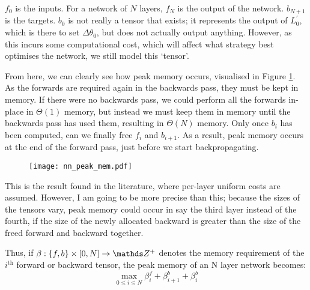 \(f_0\) is the inputs. For a network of \(N\) layers, \(f_N\) is the output of the network. \(b_{N+1}\) is the targets. \(b_0\) is not really a tensor that exists; it represents the output of \(L^\prime_{0}\), which is there to set \(\Delta\theta_0\), but does not actually output anything. However, as this incurs some computational cost, which will affect what strategy best optimises the network, we still model this `tensor'.

From here, we can clearly see how peak memory occurs, visualised in Figure \ref{fig:2-nn-peak-mem}.
As the forwards are required again in the backwards pass, they must be kept in memory.
If there were no backwards pass, we could perform all the forwards in-place in \(\Theta(1)\) memory, but instead we must keep them in memory until the backwards pass has used them, resulting in \(\Theta(N)\) memory.
Only once \(b_i\) has been computed, can we finally free \(f_i\) and \(b_{i+1}\).
As a result, peak memory occurs at the end of the forward pass, just before we start backpropagating.

\begin{figure}[hp]
    \centering
    \texttt{[image: nn\_peak\_mem.pdf]}
    \caption{}
    \label{fig:2-nn-peak-mem}
\end{figure}

This is the result found in the literature, where per-layer uniform costs are assumed.
However, I am going to be more precise than this;
because the sizes of the tensors vary, peak memory could occur in say the third layer instead of the fourth, if the size of the newly allocated backward is greater than the size of the freed forward and backward together.

Thus, if \(\beta : \{f, b\}\times[0, N] \rightarrow \Z^+\) denotes the memory requirement of the \(i^{\mathrm{th}}\) forward or backward tensor, the peak memory of an N layer network becomes:
\begin{equation}
    \label{eqn:2-nn-peak-mem}
    \max_{0 \leq i \leq N} \beta^f_i + \beta^b_{i+1} + \beta^b_i
\end{equation}
